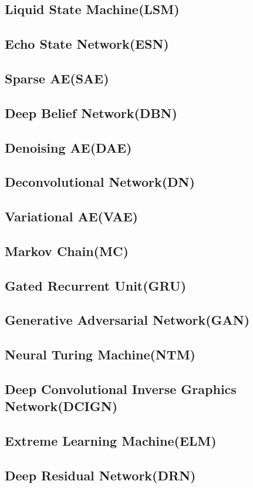 \subsection{Liquid State Machine(LSM) \cite{LSM}}
\subsection{Echo State Network(ESN) \cite{ESN}}
\subsection{Sparse AE(SAE) \cite{SAE}}
\subsection{Deep Belief Network(DBN) \cite{DBN}}
\subsection{Denoising AE(DAE) \cite{DAE}}
\subsection{Deconvolutional Network(DN) \cite{DN}}
\subsection{Variational AE(VAE) \cite{VAE}}
\subsection{Markov Chain(MC) \cite{MC}}
\subsection{Gated Recurrent Unit(GRU) \cite{GRU}}
\subsection{Generative Adversarial Network(GAN) \cite{GAN}}
\subsection{Neural Turing Machine(NTM) \cite{NTM}}
\subsection{Deep Convolutional Inverse Graphics Network(DCIGN) \cite{DCIGN}}
\subsection{Extreme Learning Machine(ELM) \cite{ELM}}
\subsection{Deep Residual Network(DRN) \cite{DRN}}